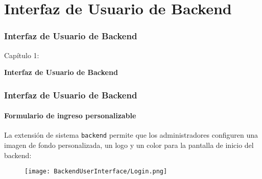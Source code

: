 %

\section{Interfaz de Usuario de Backend}
\begin{frame}[fragile]
	\frametitle{Interfaz de Usuario de Backend}

	\begin{center}\huge{Capítulo 1:}\end{center}
	\begin{center}\huge{\color{typo3darkgrey}\textbf{Interfaz de Usuario de Backend}}\end{center}

\end{frame}

\begin{frame}[fragile]
	\frametitle{Interfaz de Usuario de Backend}
	\framesubtitle{Formulario de ingreso personalizable}

	La extensión de sistema \texttt{backend} permite que los administradores 
	configuren una imagen de fondo personalizada, un logo y un color para la 
	pantalla de inicio del backend:

	\begin{figure}
		\texttt{[image: BackendUserInterface/Login.png]}
	\end{figure}

\end{frame}

